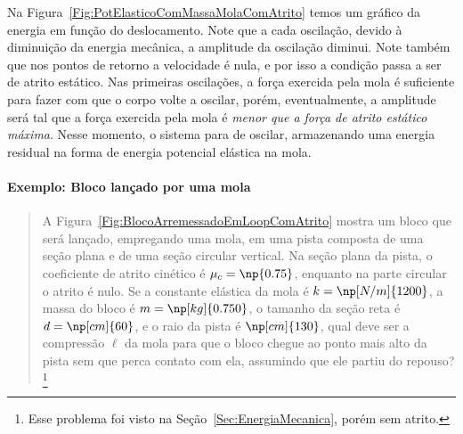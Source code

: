 Na Figura~\ref{Fig:PotElasticoComMassaMolaComAtrito} temos um gráfico da energia em função do deslocamento. Note que a cada oscilação, devido à diminuição da energia mecânica, a amplitude da oscilação diminui. Note também que nos pontos de retorno a velocidade é nula, e por isso a condição passa a ser de atrito estático. Nas primeiras oscilações, a força exercida pela mola é suficiente para fazer com que o corpo volte a oscilar, porém, eventualmente, a amplitude será tal que a força exercida pela mola é \emph{menor que a força de atrito estático máxima}. Nesse momento, o sistema para de oscilar, armazenando uma energia residual na forma de energia potencial elástica na mola.

\paragraph{Exemplo: Bloco lançado por uma mola}

\begin{quote}
    A Figura~\ref{Fig:BlocoArremessadoEmLoopComAtrito} mostra um bloco que será lançado, empregando uma mola, em uma pista composta de uma seção plana e de uma seção circular vertical. Na seção plana da pista, o coeficiente de atrito cinético é $\mu_c = \np{0.75}$, enquanto na parte circular o atrito é nulo. Se a constante elástica da mola é $k = \np[N/m]{1200}$, a massa do bloco é $m = \np[kg]{0.750}$, o tamanho da seção reta é $d = \np[cm]{60}$, e o raio da pista é $\np[cm]{130}$, qual deve ser a compressão $\ell$ da mola para que o bloco chegue ao ponto mais alto da pista sem que perca contato com ela, assumindo que ele partiu do repouso?\footnote{Esse problema foi visto na Seção~\ref{Sec:EnergiaMecanica}, porém sem atrito.}
\end{quote}


